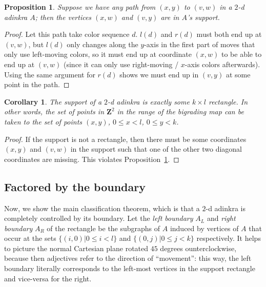 \documentclass[12pt,twoside,singlespace]{article}
\numberwithin{equation}{section}
\newtheorem{cor}[equation]{Corollary}
\newtheorem{prop}[equation]{Proposition}
\theoremstyle{definition}
\newcommand{\ZZ}{\mathbf{Z}}
\begin{document}
\begin{prop}
\label{prop:rectangle-completion}
Suppose we have any path from $(x,y)$ to $(v,w)$ in a $2$-d adinkra $A$; then the vertices $(x,w)$ and $(v,y)$ are in $A$'s support.
\end{prop}
\begin{proof}
Let this path take color sequence $d$. $l(d)$ and $r(d)$ must both end up at $(v,w)$, but $l(d)$ only changes along the $y$-axis in the first part of moves that only use left-moving colors, so it must end up at coordinate $(x,w)$ to be able to end up at $(v,w)$ (since it can only use right-moving / $x$-axis colors afterwards). Using the same argument for $r(d)$ shows we must end up in $(v,y)$ at some point in the path.
\end{proof}

\begin{cor}
\label{cor:rectangle}
The support of a $2$-d adinkra is exactly some $k \times l$ rectangle. In other words, the set of points in $\ZZ^2$ in the range of the bigrading map can be taken to the set of points $(x,y)$, $0 \leq x < l$, $0 \leq y < k$.
\end{cor}
\begin{proof}
If the support is not a rectangle, then there must be some coordinates $(x,y)$ and $(v,w)$ in the support such that one of the other two diagonal coordinates are missing. This violates Proposition~\ref{prop:rectangle-completion}.
\end{proof}

\subsection{Factored by the boundary}

Now, we show the main classification theorem, which is that a $2$-d adinkra is completely controlled by its boundary. Let the \emph{left boundary} $A_L$ and \emph{right boundary} $A_R$ of the rectangle be the subgraphs of $A$ induced by vertices of $A$ that occur at the sets $\{(i,0) | 0 \leq i < l \}$ and $\{(0, j) | 0 \leq j < k \}$ respectively. It helps to picture the normal Cartesian plane rotated $45$ degrees ounterclockwise, because then adjectives refer to the direction of ``movement'': this way, the left boundary literally corresponds to the left-most vertices in the support rectangle and vice-versa for the right.
\end{document}
